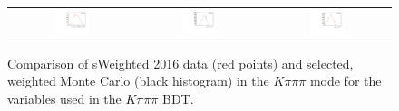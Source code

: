 \begin{figure}
\begin{tabular}{ccc}
\includegraphics[width=0.3\textwidth]{ANA_resources/Plots/Monte_carlo/data_vs_MC/weight/Kpipipi/log10(KstarPi_IPCHI2_OWNPV)_2016.pdf} & \includegraphics[width=0.3\textwidth]{ANA_resources/Plots/Monte_carlo/data_vs_MC/weight/Kpipipi/log10(KstarK_PT)_2016.pdf} & \includegraphics[width=0.3\textwidth]{ANA_resources/Plots/Monte_carlo/data_vs_MC/weight/Kpipipi/log10(KstarPi_PT)_2016.pdf} \\
\end{tabular}
\caption{Comparison of sWeighted 2016 data (red points) and selected, weighted Monte Carlo (black histogram) in the $K\pi\pi\pi$ mode for the variables used in the $K\pi\pi\pi$ BDT.}
\label{fig:data_vs_MC_Kpipipi_2016}
\end{figure}
